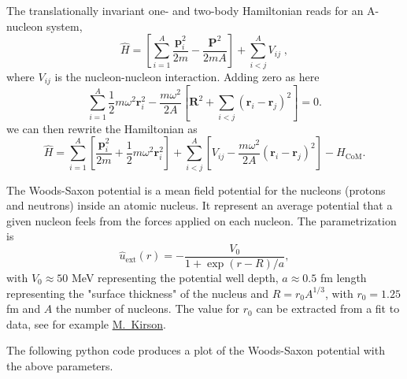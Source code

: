 \documentclass[%
twoside,                 %
final,                   %
10pt]{article}
\begin{document}
 The translationally invariant one- and two-body  Hamiltonian reads for an A-nucleon system,
 \[
\label{eq:ham}
\hat{H}=\left[\sum_{i=1}^A\frac{\bm{p}_i^2}{2m} -\frac{\bm{P}^2}{2mA}\right] +\sum_{i < j}^A V_{ij} \; ,
 \]
 where $V_{ij}$ is the nucleon-nucleon interaction. Adding zero as here
\[
 \sum_{i=1}^A\frac{1}{2}m\omega^2\bm{r}_i^2-
 \frac{m\omega^2}{2A}\left[\bm{R}^2+\sum_{i < j}(\bm{r}_i-\bm{r}_j)^2\right]=0.
 \]
we can then rewrite the Hamiltonian as 
\[
 \hat{H}=\sum_{i=1}^A \left[ \frac{\bm{p}_i^2}{2m}
 +\frac{1}{2}m\omega^2 \bm{r}^2_i
 \right] + \sum_{i < j}^A \left[ V_{ij}-\frac{m\omega^2}{2A}
 (\bm{r}_i-\bm{r}_j)^2
 \right]-H_{\mathrm{CoM}}.
 \]


The Woods-Saxon potential is a mean field potential for the nucleons (protons and neutrons) 
inside an atomic nucleus. It represent an average potential that a given nucleon feels from  the forces applied on each nucleon. 
The parametrization is
\[
\hat{u}_{\mathrm{ext}}(r)=-\frac{V_0}{1+\exp{(r-R)/a}},
\]
with $V_0\approx 50$ MeV representing the potential well depth, $a\approx 0.5$ fm 
length representing the "surface thickness" of the nucleus and $R=r_0A^{1/3}$, with $r_0=1.25$ fm and $A$ the number of nucleons.
The value for $r_0$ can be extracted from a fit to data, see for example \href{{http://www.sciencedirect.com/science/article/pii/S037594740600769X}}{M.~Kirson}.

The following python code produces a plot of the Woods-Saxon potential with the above parameters. 
\end{document}
